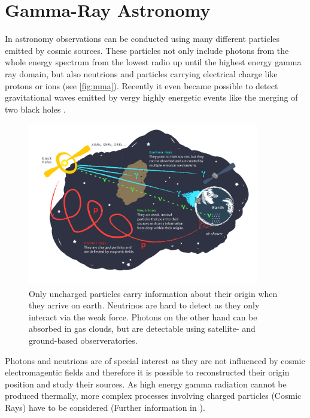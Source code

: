 \chapter{Gamma-Ray Astronomy}
In astronomy observations can be conducted using many different particles emitted by cosmic sources. 
These particles not only include photons from the whole energy spectrum from the lowest radio up until the highest energy gamma ray domain,
but also neutrions and particles carrying electrical charge like protons or ions (see \autoref{fig:mma}). 
Recently it even became possible to detect gravitational waves emitted by vergy highly energetic events like the merging of two black holes \cite{PhysRevLett.116.061102}.
\begin{figure}
    \centering
    \includegraphics[width=0.9\textwidth]{images/cosmic_messengers.png}
    \caption{Only uncharged particles carry information about their origin when they arrive on earth.
        Neutrinos are hard to detect as they only interact via the weak force.
        Photons on the other hand can be absorbed in gas clouds, but are detectable using satellite- and ground-based observeratories.
    }
    \label{fig:mma}
\end{figure}

Photons and neutrions are of special interest as they are not influenced by cosmic electromagentic fields and therefore it is possible to reconstructed their origin 
position and study their sources.
As high energy gamma radiation cannot be produced thermally, more complex processes involving charged particles (Cosmic Rays) have to be considered 
(Further information in \cite{s_funk}).

